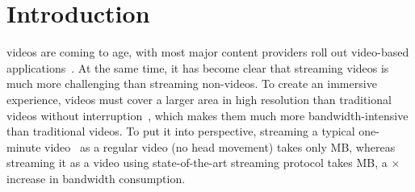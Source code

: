 
\section{Introduction}



\vr videos are coming to age, with most major content providers roll out {\vr}video-based applications~\cite{??,??,??,??,??}.
At the same time, it has become clear that streaming \vr videos is much more challenging than streaming non-\vr videos.
To create an immersive experience, \vr videos must cover a larger area in high resolution than traditional videos without interruption~\cite{??}, which makes them much more bandwidth-intensive than traditional videos.
To put it into perspective, streaming a typical one-minute \vr video~\cite{give the url} as a regular video (\ie no head movement) takes only \fillme MB, whereas streaming it as a \vr video using state-of-the-art \vr streaming protocol takes \fillme MB, a \fillme$\times$ increase in bandwidth consumption.

